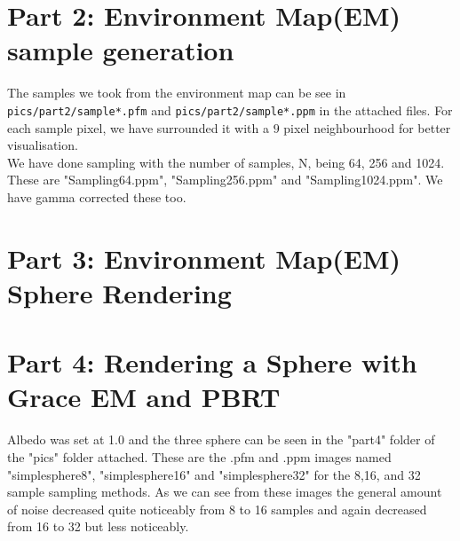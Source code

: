 \documentclass{article}
\begin{document}
\section{Part 2: Environment Map(EM) sample generation}
The samples we took from the environment map can be see in 
\texttt{pics/part2/sample*.pfm} and \texttt{pics/part2/sample*.ppm} in the 
attached files. For each sample pixel, we have surrounded it with a $9$ pixel 
neighbourhood for better visualisation. 
\\
We have done sampling with the number of samples, N, being 64, 256 and 1024.
These are "Sampling64.ppm", "Sampling256.ppm" and "Sampling1024.ppm". We have
gamma corrected these too.

\section{Part 3: Environment Map(EM) Sphere Rendering}



\section{Part 4: Rendering a Sphere with Grace EM and PBRT}
Albedo was set at 1.0 and the three sphere can be seen in the
"part4" folder of the "pics" folder attached. These are the
.pfm and .ppm images named "simplesphere8", 
"simplesphere16" and "simplesphere32" for the 8,16, and
32 sample sampling methods.
As we can see from these images the general amount of noise 
decreased quite noticeably from 8 to 16 samples and again 
decreased from 16 to 32 but less noticeably.
\end{document}

